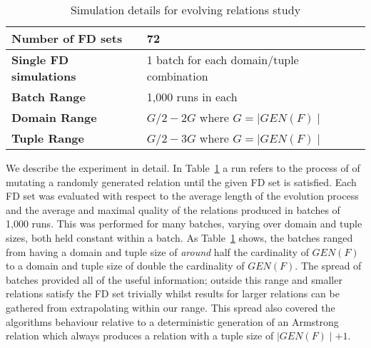 \medskip

{\line
\begin{table}[ht]
\begin{center}
\begin{tabular}{|l||l|}
\hline
{\bf Number of FD sets}  & 72 \\ \hline
{\bf Single FD simulations} & 1 batch for each domain/tuple combination\\ \hline
{\bf Batch Range} & 1,000 runs in each \\ \hline
{\bf Domain Range} & $G/2 - 2G$ where $ G = \mid GEN(F) \mid$  \\ \hline
{\bf Tuple Range} & $G/2 - 3G$  where $ G = \mid GEN(F) \mid$  \\ \hline 
\end{tabular}
\end{center}
\caption{\label{table:5.01} Simulation details for evolving relations study}
\end{table}
}


We describe the experiment in detail. In Table~\ref{table:5.01} a
run refers to the process of  of mutating
a randomly generated relation until the given FD set is satisfied.
 Each FD set was evaluated with respect to the average length of the
 evolution process and the average and maximal quality of the relations
 produced in batches of 1,000 runs.
This was performed for many batches, varying over domain and tuple
sizes, both held constant within a batch. As Table~\ref{table:5.01} 
shows, the batches ranged from having a domain and tuple size
of {\em around} half the cardinality of $GEN(F)$ to
a domain and tuple size of double the cardinality of $GEN(F)$.
  The spread of batches provided all of the useful
information; outside this range and smaller relations satisfy the
FD set trivially whilst results for larger relations can be gathered
from extrapolating within our range. This spread also covered the
algorithms behaviour relative to a deterministic generation
of an Armstrong relation which always produces a relation with
a tuple size of $\mid GEN(F) \mid + 1$.

\medskip


